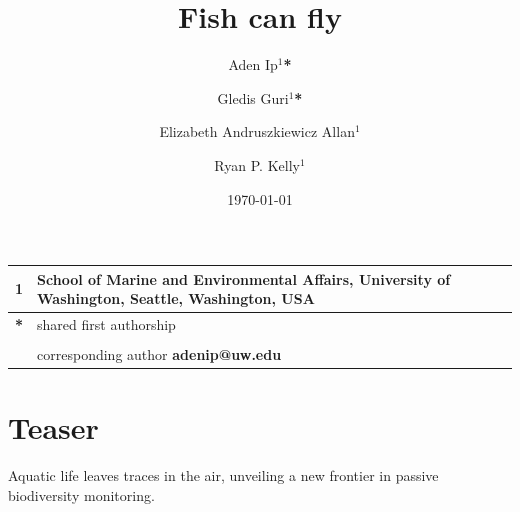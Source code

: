 \documentclass{article}
\title{Fish can fly}
\author{Aden Ip$^1$\textbf{*} \and
Gledis Guri$^1$\textbf{*} \and
Elizabeth Andruszkiewicz Allan$^1$ \and
Ryan P. Kelly$^1$}
\date{\today}
\begin{document}
\maketitle

\section*{}

\begin{center}
\begin{tabular}{ll}
1 & School of Marine and Environmental Affairs, University of Washington, Seattle, Washington, USA \\
\hline
\textbf{*} & shared first authorship\\
&\\
& corresponding author \textbf{adenip@uw.edu}
\end{tabular}
\end{center}

\section*{Teaser}
Aquatic life leaves traces in the air, unveiling a new frontier in passive biodiversity monitoring.
\end{document}
